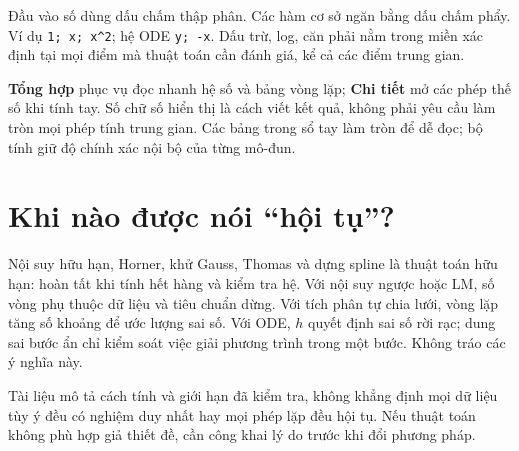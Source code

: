 Đầu vào số dùng dấu chấm thập phân. Các hàm cơ sở ngăn bằng dấu chấm phẩy. Ví dụ \texttt{1; x; x\^{}2}; hệ ODE \texttt{y; -x}. Dấu trừ, log, căn phải nằm trong miền xác định tại mọi điểm mà thuật toán cần đánh giá, kể cả các điểm trung gian.

\textbf{Tổng hợp} phục vụ đọc nhanh hệ số và bảng vòng lặp; \textbf{Chi tiết} mở các phép thế số khi tính tay. Số chữ số hiển thị là cách viết kết quả, không phải yêu cầu làm tròn mọi phép tính trung gian. Các bảng trong sổ tay làm tròn để dễ đọc; bộ tính giữ độ chính xác nội bộ của từng mô-đun.

\section*{Khi nào được nói ``hội tụ''?}
Nội suy hữu hạn, Horner, khử Gauss, Thomas và dựng spline là thuật toán hữu hạn: hoàn tất khi tính hết hàng và kiểm tra hệ. Với nội suy ngược hoặc LM, số vòng phụ thuộc dữ liệu và tiêu chuẩn dừng. Với tích phân tự chia lưới, vòng lặp tăng số khoảng để ước lượng sai số. Với ODE, $h$ quyết định sai số rời rạc; dung sai bước ẩn chỉ kiểm soát việc giải phương trình trong một bước. Không tráo các ý nghĩa này.

Tài liệu mô tả cách tính và giới hạn đã kiểm tra, không khẳng định mọi dữ liệu tùy ý đều có nghiệm duy nhất hay mọi phép lặp đều hội tụ. Nếu thuật toán không phù hợp giả thiết đề, cần công khai lý do trước khi đổi phương pháp.
